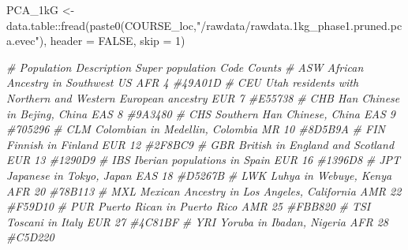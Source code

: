 \documentclass[
]{book}
\newenvironment{Shaded}{\begin{snugshade}}{\end{snugshade}}
\newcommand{\AttributeTok}[1]{\textcolor[rgb]{0.77,0.63,0.00}{#1}}
\newcommand{\CommentTok}[1]{\textcolor[rgb]{0.56,0.35,0.01}{\textit{#1}}}
\newcommand{\ConstantTok}[1]{\textcolor[rgb]{0.00,0.00,0.00}{#1}}
\newcommand{\DecValTok}[1]{\textcolor[rgb]{0.00,0.00,0.81}{#1}}
\newcommand{\FunctionTok}[1]{\textcolor[rgb]{0.00,0.00,0.00}{#1}}
\newcommand{\NormalTok}[1]{#1}
\newcommand{\OtherTok}[1]{\textcolor[rgb]{0.56,0.35,0.01}{#1}}
\newcommand{\SpecialCharTok}[1]{\textcolor[rgb]{0.00,0.00,0.00}{#1}}
\newcommand{\StringTok}[1]{\textcolor[rgb]{0.31,0.60,0.02}{#1}}
\begin{document}
\begin{Shaded}
\begin{Highlighting}[]
\NormalTok{PCA\_1kG }\OtherTok{\textless{}{-}}\NormalTok{ data.table}\SpecialCharTok{::}\FunctionTok{fread}\NormalTok{(}\FunctionTok{paste0}\NormalTok{(COURSE\_loc,}\StringTok{"/rawdata/rawdata.1kg\_phase1.pruned.pca.evec"}\NormalTok{), }\AttributeTok{header =} \ConstantTok{FALSE}\NormalTok{, }\AttributeTok{skip =} \DecValTok{1}\NormalTok{)}

\CommentTok{\# Population    Description Super population    Code    Counts}
\CommentTok{\# ASW   African Ancestry in Southwest US                              AFR   4     \#49A01D}
\CommentTok{\# CEU   Utah residents with Northern and Western European ancestry  EUR 7     \#E55738}
\CommentTok{\# CHB   Han Chinese in Bejing, China                                  EAS   8     \#9A3480}
\CommentTok{\# CHS   Southern Han Chinese, China                                 EAS 9     \#705296}
\CommentTok{\# CLM   Colombian in Medellin, Colombia                             MR  10  \#8D5B9A}
\CommentTok{\# FIN   Finnish in Finland                                          EUR 12  \#2F8BC9}
\CommentTok{\# GBR   British in England and Scotland                             EUR 13  \#1290D9}
\CommentTok{\# IBS   Iberian populations in Spain                                  EUR   16  \#1396D8}
\CommentTok{\# JPT   Japanese in Tokyo, Japan                                      EAS   18  \#D5267B}
\CommentTok{\# LWK   Luhya in Webuye, Kenya                                      AFR 20  \#78B113}
\CommentTok{\# MXL   Mexican Ancestry in Los Angeles, California                 AMR 22  \#F59D10}
\CommentTok{\# PUR   Puerto Rican in Puerto Rico                                 AMR 25  \#FBB820}
\CommentTok{\# TSI   Toscani in Italy                                              EUR   27  \#4C81BF}
\CommentTok{\# YRI   Yoruba in Ibadan, Nigeria                                     AFR   28  \#C5D220}


\end{Highlighting}
\end{Shaded}
\end{document}

